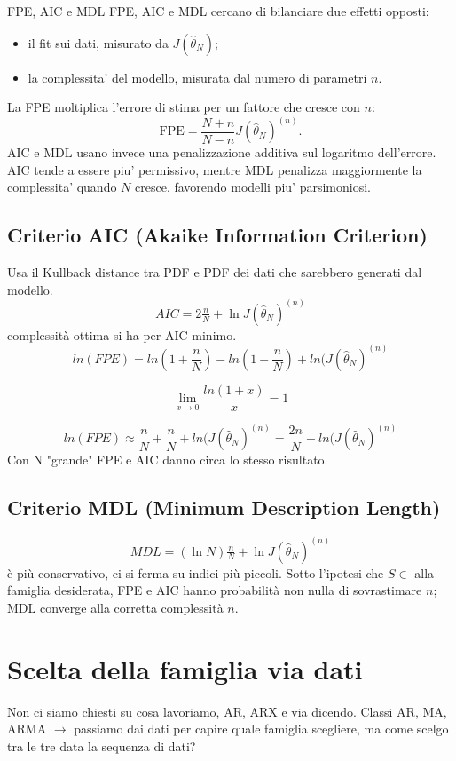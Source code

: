 \documentclass[11pt,a4paper]{article}
\begin{document}
\begin{spiegazione}{FPE, AIC e MDL}
FPE, AIC e MDL cercano di bilanciare due effetti opposti:
\begin{itemize}
  \item il fit sui dati, misurato da $J(\hat\theta_N)$;
  \item la complessita' del modello, misurata dal numero di parametri $n$.
\end{itemize}
La FPE moltiplica l'errore di stima per un fattore che cresce con $n$:
\[
\mathrm{FPE}=\frac{N+n}{N-n}J(\hat\theta_N)^{(n)}.
\]
AIC e MDL usano invece una penalizzazione additiva sul logaritmo dell'errore. AIC tende a essere piu' permissivo, mentre MDL penalizza maggiormente la complessita' quando $N$ cresce, favorendo modelli piu' parsimoniosi.
\end{spiegazione}

\subsection{Criterio AIC (Akaike Information Criterion)}
Usa il Kullback distance tra PDF e PDF dei dati che sarebbero generati dal modello.
\[
AIC = 2\tfrac{n}{N}+\ln J(\hat\theta_N)^{(n)}
\]
complessità ottima si ha per AIC minimo. 
\[
ln(FPE) = ln(1+\frac{n}{N}) - ln(1-\frac{n}{N}) + ln(J(\hat \theta_N)^{(n)}
\]

\[
\lim_{x\to 0} \frac{ln(1+x)}{x} = 1
\]

\[
ln(FPE) \approx \frac{n}{N} + \frac{n}{N} + ln(J(\hat \theta_N)^{(n)} = \frac{2n}{N}+ln(J(\hat \theta_N)^{(n)}
\]
Con N "grande" FPE e AIC danno circa lo stesso risultato.
\subsection{Criterio MDL (Minimum Description Length)}
\[
MDL=(\ln N)\tfrac{n}{N}+\ln J(\hat\theta_N)^{(n)}
\]
 è più conservativo, ci si ferma su indici più piccoli. Sotto l'ipotesi che $S\in$ alla famiglia desiderata, FPE e AIC hanno probabilità non nulla di sovrastimare $n$; MDL converge alla corretta complessità $n$.


\section{Scelta della famiglia via dati}
Non ci siamo chiesti su cosa lavoriamo, AR, ARX e via dicendo. Classi AR, MA, ARMA $\rightarrow$ passiamo dai dati per capire quale famiglia scegliere, ma come scelgo tra le tre data la sequenza di dati?
\end{document}
